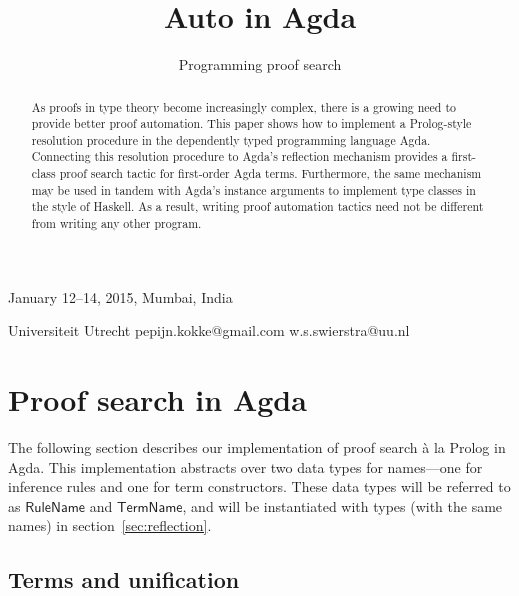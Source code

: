 \documentclass[preprint]{sigplanconf}
\newcommand{\Conid}[1]{\mathit{#1}}
\newcommand{\Varid}[1]{\mathit{#1}}
\renewcommand\Varid[1]{\mathord{\textsf{#1}}}
\let\Conid\Varid
\begin{document}
 {January 12--14, 2015, Mumbai, India}

\title{Auto in Agda}
\subtitle{Programming proof search}

           {Universiteit Utrecht}
           {pepijn.kokke@gmail.com \quad w.s.swierstra@uu.nl}

\maketitle

\begin{abstract}

  As proofs in type theory become increasingly complex, there is a
  growing need to provide better proof automation. This paper shows
  how to implement a Prolog-style resolution procedure in the
  dependently typed programming language Agda. Connecting this
  resolution procedure to Agda's reflection mechanism provides a
  first-class proof search tactic for first-order Agda
  terms. Furthermore, the same mechanism may be used in tandem with
  Agda's instance arguments to implement type classes in the style of
  Haskell. As a result, writing proof automation tactics need not be
  different from writing any other program.

\end{abstract}

\section{Proof search in Agda}
\label{sec:prolog}

The following section describes our implementation of proof search
à la Prolog in Agda. This implementation abstracts over two data types
for names---one for inference rules and one for term constructors.
These data types will be referred to as \ensuremath{\Conid{RuleName}} and \ensuremath{\Conid{TermName}}, and
will be instantiated with types (with the same names) in
section~\ref{sec:reflection}.


\subsection*{Terms and unification}
\end{document}
